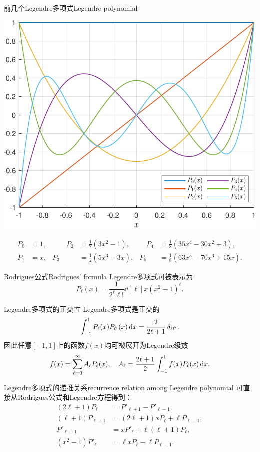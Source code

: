 \begin{example}{前几个Legendre多项式}{Legendre polynomial}
    \begin{center}
        \includegraphics[width=0.7\linewidth]{figures/Legendre.pdf}
    \end{center}
    \begin{equation*}
        \begin{aligned}
            P_0&=1,&\qquad P_2&=\frac12(3x^2-1),&\quad P_4&=\frac18(35x^4-30x^2+3),\\
            P_1&=x,&P_3&=\frac12(5x^3-3x),&P_5&=\frac18(63x^5-70x^3+15x).
        \end{aligned}
    \end{equation*}
\end{example}
\begin{theorem}{Rodrigues公式}{Rodrigues' formula}
    Legendre多项式可被表示为
    \begin{equation}
        \label{eqn:Rodrigues}
        P_\ell(x)=\frac1{2^\ell\ell!}\dd[\ell]x(x^2-1)^\ell.
    \end{equation}
\end{theorem}
\begin{theorem}
    {Legendre多项式的正交性}{}
    Legendre多项式是正交的
    \[
        \int_{-1}^1P_\ell(x)P_{\ell'}(x)\mathop{}\!\mathrm{d} x=\frac2{2\ell+1}\mathop{}\!\delta_{\ell\ell'}.
    \]
    因此任意$[-1,1]$上的函数$f(x)$均可被展开为Legendre级数
    \[
        f(x)=\sum_{\ell=0}^\infty A_\ell P_\ell(x),\quad A_\ell=\frac{2\ell+1}2\int_{-1}^1f(x)P_\ell(x)\mathop{}\!\mathrm{d} x.
    \]
\end{theorem}
\begin{theorem}{Legendre多项式的递推关系}{recurrence relation among Legendre polynomial}
    可直接从Rodrigues公式和Legendre方程得到：
    \begin{subequations}
        \begin{align}
            \label{eqn:Legendre recurrence 1}
            (2\ell+1)P_\ell&=P'_{\ell+1}-P'_{\ell-1},\\
            (\ell+1)P_{\ell+1}&=(2\ell+1)xP_\ell+\ell P_{\ell-1},\\
            P'_{\ell+1}&=xP'_\ell+\ell(\ell+1)P_\ell,\\
            (x^2-1)P'_\ell&=\ell xP_\ell-\ell P_{\ell-1}.
        \end{align}
    \end{subequations}
\end{theorem}

